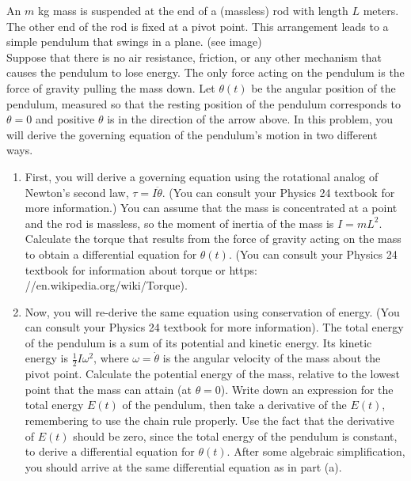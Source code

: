 \begin{problem}[2]
An $m$ kg mass is suspended at the end of a (massless) rod with length $L$ meters. The other end of the rod is fixed at a pivot point. This arrangement leads to a simple pendulum that swings in a plane. (see image)\\
Suppose that there is no air resistance, friction, or any other mechanism that causes the pendulum to lose energy. The only force acting on the pendulum is the force of gravity pulling the mass down. Let $\theta(t)$ be the angular position of the pendulum, measured so that the resting position of the pendulum corresponds to $\theta = 0$ and positive $\theta$ is in the direction of the arrow above. In this problem, you will derive the governing equation of the pendulum’s motion in two different ways.

\begin{enumerate}
\item First, you will derive a governing equation using the rotational analog of Newton’s second law, $\tau = I\ddot{\theta}.$ (You can consult your Physics 24 textbook for more information.) You can assume that the mass is concentrated at a point and the rod is massless, so the moment of inertia of the mass is $I = mL^2$. Calculate the torque that results from the force of gravity acting on the mass to obtain a differential equation for $\theta(t)$. (You can consult your Physics 24 textbook for information about torque or https: //en.wikipedia.org/wiki/Torque).
\item Now, you will re-derive the same equation using conservation of energy. (You can consult
your Physics 24 textbook for more information). The total energy of the pendulum is
a sum of its potential and kinetic energy. Its kinetic energy is $\frac 12 I\omega ^2$, where $\omega = \dot{\theta}$ is the angular velocity of the mass about the pivot point. Calculate the potential energy of the mass, relative to the lowest point that the mass can attain (at $\theta = 0$). Write down an expression for the total energy $E(t)$ of the pendulum, then take a derivative of the $E(t)$, remembering to use the chain rule properly. Use the fact that the derivative of $E(t)$ should be zero, since the total energy of the pendulum is constant, to derive a differential equation for $\theta(t)$. After some algebraic simplification, you should arrive at the same differential equation as in part (a).
\end{enumerate}
\end{problem}

